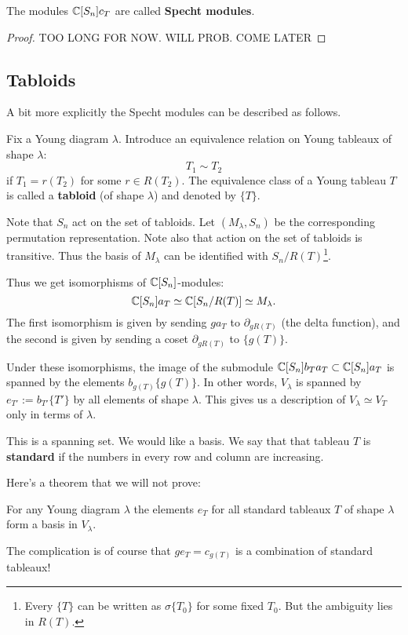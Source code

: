 \documentclass[11pt, english]{article}
\begin{document}
The modules $\mathbb{C}[S_n]c_T$ are called \textbf{Specht modules}.

\begin{proof}
  TOO LONG FOR NOW. WILL PROB. COME LATER
\end{proof}

\subsection{Tabloids}

A bit more explicitly the Specht modules can be described as follows.

Fix a Young diagram $\lambda$. Introduce an equivalence relation on Young tableaux of shape $\lambda$:
$$
T_1 \sim T_2 
$$
if $T_1 = r(T_2)$ for some $r \in R(T_2)$. The equivalence class of a Young tableau $T$ is called a \textbf{tabloid} (of shape $\lambda$) and denoted by $\{ T \}$. 

Note that $S_n$ act on the set of tabloids. Let $(M_\lambda,S_n)$ be the corresponding permutation representation. Note also that action on the set of tabloids is transitive. Thus the basis of $M_\lambda$ can be identified with $S_n/R(T)$\footnote{Every $\{T \}$ can be written as $\sigma \{ T_0\}$ for some fixed $T_0$. But the ambiguity lies in $R(T)$.}.  

Thus we get isomorphisms of $\mathbb{C}[S_n]$-modules:
$$
\mathbb{C}[S_n]a_T \simeq \mathbb{C}[S_n/R(T)] \simeq M_\lambda.
$$
The first isomorphism is given by sending $ga_T$ to $\partial_{gR(T)}$ (the delta function), and the second is given by sending a coset $\partial_{gR(T)}$ to $\{g(T)\}$. 

Under these isomorphisms, the image of the  submodule $\mathbb{C}[S_n]b_T a_T \subset \mathbb{C}[S_n]a_T$ is spanned by the elements $b_{g(T)} \{ g(T) \}$. In other words, $V_\lambda$ is spanned by $e_{T'} := b_{T'} \{ T' \}$ by all elements of shape $\lambda$. This gives us a description of $V_\lambda \simeq V_T$ only in terms of $\lambda$.

This is a spanning set. We would like a basis. We say that that tableau $T$ is \textbf{standard} if the numbers in every row and column are increasing.

Here's a theorem that we will not prove:
\begin{thm}
 For any Young diagram $\lambda$ the elements $e_T$ for all standard tableaux $T$ of shape $\lambda$ form a basis in $V_\lambda$.
\end{thm}

The complication is of course that $g e_T = c_{g(T)}$ is a combination of standard tableaux! 
\end{document}

